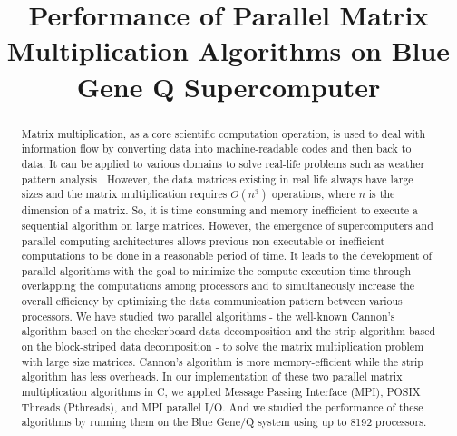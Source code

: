 \documentclass[conference]{IEEEtran}
\begin{document}
\title{Performance of Parallel Matrix Multiplication Algorithms on Blue Gene Q Supercomputer}

\author{
\and
{}

}

\maketitle
\thispagestyle{plain}
\pagestyle{plain}

\begin{abstract}
Matrix multiplication, as a core scientific computation operation, is used to deal with information flow by converting data into machine-readable codes and then back to data. It can be applied to various domains to solve real-life problems such as weather pattern analysis \cite{b1}. However, the data matrices existing in real life always have large sizes and the matrix multiplication requires $O(n^3)$ operations, where $n$ is the dimension of a matrix. So, it is time consuming and memory inefficient to execute a sequential algorithm on large matrices. However, the emergence of supercomputers and parallel computing architectures allows previous non-executable or inefficient computations to be done in a reasonable period of time. It leads to the development of parallel algorithms with the goal to minimize the compute execution time through overlapping the computations among processors and to simultaneously increase the overall efficiency by optimizing the data communication pattern between various processors. We have studied two parallel algorithms - the well-known Cannon's algorithm based on the checkerboard data decomposition and the strip algorithm based on the block-striped data decomposition - to solve the matrix multiplication problem with large size matrices. Cannon's algorithm is more memory-efficient while the strip algorithm has less overheads. In our implementation of these two parallel matrix multiplication algorithms in C, we applied Message Passing Interface (MPI), POSIX Threads (Pthreads), and MPI parallel I/O. And we studied the performance of these algorithms by running them on the Blue Gene/Q system using up to 8192 processors. 
\end{abstract}
\end{document}
